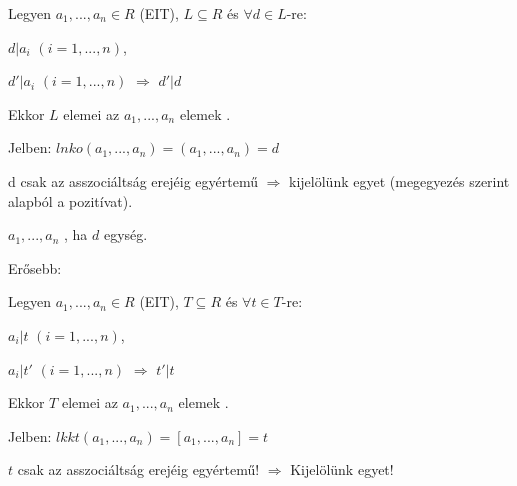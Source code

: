 \begin{frame}
  \begin{tcolorbox}[title={Def.: Legnagyobb közös osztó}]
      Legyen $a_1, ..., a_n \in R$ (EIT), $L \subseteq R $ és ${\forall}d \in L$-re:\\
      \mmedskip

      $d|a_i$ $(i = 1, ..., n)$,\\
      \mmedskip

      $d' | a_i$ $(i = 1, ..., n)$ $\Rightarrow$ $d'|d$\\
      \mmedskip

      Ekkor $L$ elemei az $a_1, ..., a_n$ elemek .\\
      \mmedskip

      Jelben: $lnko(a_1, ..., a_n) = (a_1, ..., a_n) = d$\\
      \mmedskip

      d csak az asszociáltság erejéig egyértemű $\Rightarrow$ kijelölünk egyet (megegyezés szerint alapból a pozitívat).
  \end{tcolorbox}

  \begin{tcolorbox}[title={Def.: Relatív prím, Páronként relatív prím}]
    $a_1, ..., a_n$ , ha $d$ egység.\\
    \mmedskip

    Erősebb: 
  \end{tcolorbox}

  \begin{tcolorbox}[title={Def.: Legkisebb közös többszörös}]
      Legyen $a_1, ..., a_n \in R$ (EIT), $T \subseteq R $ és ${\forall}t \in T$-re:\\
      \mmedskip

      $a_i|t$ $(i = 1, ..., n)$,\\
      \mmedskip

      $a_i|t'$ $(i = 1, ..., n)$ $\Rightarrow$ $t'|t$\\
      \mmedskip

      Ekkor $T$ elemei az $a_1, ..., a_n$ elemek .\\
      \mmedskip

      Jelben: $lkkt(a_1, ..., a_n) = [a_1, ..., a_n] = t$\\
      \mmedskip

      $t$ csak az asszociáltság erejéig egyértemű! $\Rightarrow$ Kijelölünk egyet!
  \end{tcolorbox}
\end{frame}


